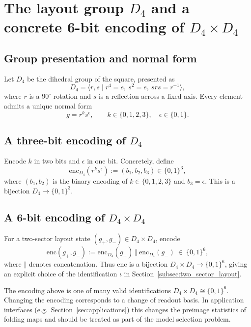 
\section{The layout group \texorpdfstring{$D_4$}{D4} and a concrete 6-bit encoding of \texorpdfstring{$D_4\times D_4$}{D4xD4}}
\label{app:d4_encoding}

\subsection{Group presentation and normal form}
Let $D_4$ be the dihedral group of the square, presented as
\[
D_4=\langle r,s\mid r^4=e,\ s^2=e,\ srs=r^{-1}\rangle,
\]
where $r$ is a $90^\circ$ rotation and $s$ is a reflection across a fixed axis.
Every element admits a unique normal form
\[
g=r^k s^\epsilon,
\qquad k\in\{0,1,2,3\},\quad \epsilon\in\{0,1\}.
\]

\subsection{A three-bit encoding of \texorpdfstring{$D_4$}{D4}}
Encode $k$ in two bits and $\epsilon$ in one bit.
Concretely, define
\[
\mathrm{enc}_{D_4}(r^k s^\epsilon):=(b_1,b_2,b_3)\in\{0,1\}^3,
\]
where $(b_1,b_2)$ is the binary encoding of $k\in\{0,1,2,3\}$ and $b_3=\epsilon$.
This is a bijection $D_4\to\{0,1\}^3$.

\subsection{A 6-bit encoding of \texorpdfstring{$D_4\times D_4$}{D4xD4}}
For a two-sector layout state $(g_+,g_-)\in D_4\times D_4$, encode
\[
\mathrm{enc}(g_+,g_-):=\mathrm{enc}_{D_4}(g_+)\ \Vert\ \mathrm{enc}_{D_4}(g_-)\ \in\ \{0,1\}^6,
\]
where $\Vert$ denotes concatenation.
Thus $\mathrm{enc}$ is a bijection $D_4\times D_4\to\{0,1\}^6$, giving an explicit choice of the identification $\iota$ in Section~\ref{subsec:two_sector_layout}.

\begin{remark}
The encoding above is one of many valid identifications $D_4\times D_4\cong \{0,1\}^6$.
Changing the encoding corresponds to a change of readout basis.
In application interfaces (e.g.\ Section~\ref{sec:applications}) this changes the preimage statistics of folding maps and should be treated as part of the model selection problem.
\end{remark}


